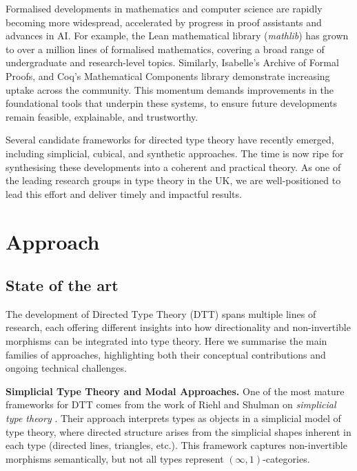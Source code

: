 \documentclass[a4paper,11pt]{article}
\renewcommand{\paragraph}[1]{\textbf{#1.}}
\begin{document}
Formalised developments in mathematics and computer science are
rapidly becoming more widespread, accelerated by progress in proof
assistants and advances in AI. For example, the Lean mathematical
library (\emph{mathlib}) has grown to over a million lines of
formalised mathematics, covering a broad range of undergraduate and
research-level topics. Similarly, 
Isabelle’s Archive of Formal Proofs, and Coq’s Mathematical Components
library demonstrate increasing uptake across the community. This
momentum demands improvements in the foundational tools that underpin
these systems, to ensure future developments remain feasible,
explainable, and trustworthy.

Several candidate frameworks for directed type theory have recently
emerged, including simplicial, cubical, and synthetic approaches. The
time is now ripe for synthesising these developments into a coherent
and practical theory. As one of the leading research groups in type
theory in the UK, we are well-positioned to lead this effort and
deliver timely and impactful results.

\section{Approach} %


\subsection{State of the art}\label{state-of-the-art}

The development of Directed Type Theory (DTT) spans multiple lines of
research, each offering different insights into how directionality and
non-invertible morphisms can be integrated into type theory. Here we
summarise the main families of approaches, highlighting both their
conceptual contributions and ongoing technical challenges.

\paragraph{Simplicial Type Theory and Modal Approaches}
One of the most mature frameworks for DTT comes from the work
of Riehl and Shulman on \emph{simplicial type theory}
\cite{riehlshulman2017}. Their approach interprets types as objects in
a simplicial model of type theory, where directed structure arises
from the simplicial shapes inherent in each type (directed lines, triangles, etc.).
This framework captures non-invertible morphisms
semantically, but not all types represent $(\infty,1)$-categories.
\end{document}

